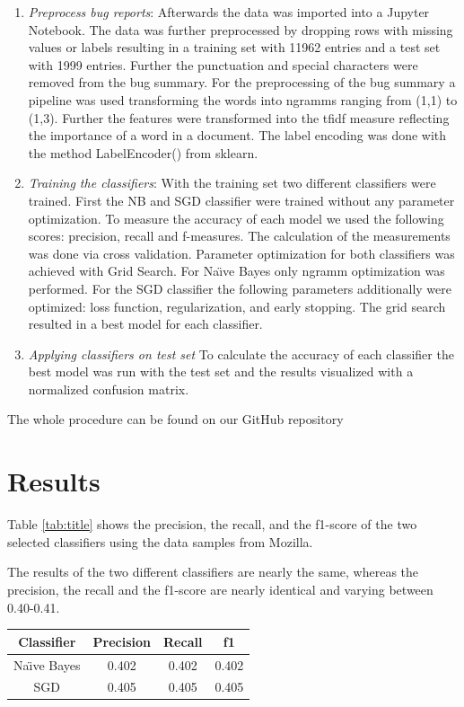 \documentclass[sigconf,screen]{acmart}
\begin{document}
\begin{enumerate}
	\item \textit{Preprocess bug reports}: Afterwards the data was imported into a Jupyter Notebook. The data was further preprocessed by dropping rows with missing values or labels resulting in a training set with 11962 entries and a test set with 1999 entries. Further the punctuation and special characters were removed from the bug summary. For the preprocessing of the bug summary a pipeline was used transforming the words into ngramms ranging from (1,1) to (1,3). Further the features were transformed into the tfidf measure reflecting the importance of a word in a document. The label encoding was done with the method LabelEncoder() from sklearn.
	\item \textit{Training the classifiers}: With the training set two different classifiers were trained. First the NB and SGD classifier were trained without any parameter optimization. To measure the accuracy of each model we used the following scores: precision, recall and f-measures. The calculation of the measurements was done via cross validation. Parameter optimization for both classifiers was achieved with Grid Search. For Na{\"\i}ve Bayes only ngramm optimization was performed. For the SGD classifier the following parameters additionally were optimized: loss function, regularization, and early stopping. The grid search resulted in a best model for each classifier.
	\item \textit{Applying classifiers on test set} To calculate the accuracy of each classifier the best model was run with the test set and the results visualized with a normalized confusion matrix. 
	
\end{enumerate}

The whole procedure can be found on our GitHub repository \cite{ourRepo}

\section{Results}
Table \ref{tab:title} shows the precision, the recall, and the f1-score of the two selected classifiers using the data samples from Mozilla.

The results of the two different classifiers are nearly the same, whereas the precision, the recall and the f1-score are nearly identical and varying between 0.40-0.41.

\begin{center}
	\centering
	\label{tab:title} 
	\begin{tabular}{ |c|c|c|c| } 
		\hline
		\textbf{Classifier} & \textbf{Precision} & \textbf{Recall} & \textbf{f1} \\
		\hline
		Na{\"\i}ve Bayes & 0.402 & 0.402 & 0.402 \\
		\hline
		SGD & 0.405 & 0.405 & 0.405 \\
		\hline
	\end{tabular}
\end{center}
\end{document}
